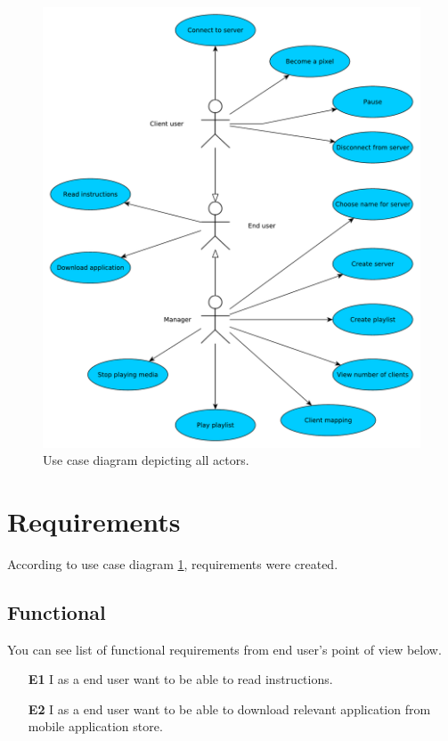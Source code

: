 \begin{figure}[!h]
    \begin{center}
    \includegraphics[scale=0.4]{images/usecase.pdf}
    \caption{Use case diagram depicting all actors.}
    \label{img:usecase}
    \end{center}
\end{figure}

\section{Requirements}
According to use case diagram \ref{img:usecase}, requirements were created.


\subsection{Functional}
You can see list of functional requirements from end user's point of view below.
\begin{enumerate}
	\item[\textbf{E1}] \label{req_E1}
		I as a end user want to be able to read instructions.
		
	\item[\textbf{E2}] \label{req_E2}
		I as a end user want to be able to download relevant application from mobile application store.
\end{enumerate}

